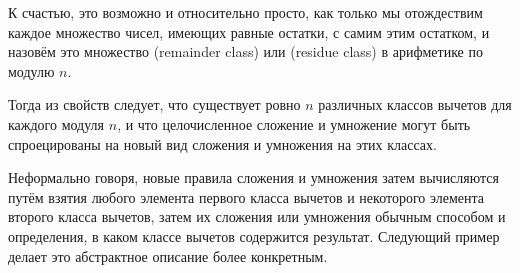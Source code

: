К счастью, это возможно и относительно просто, как только мы отождествим каждое множество чисел, имеющих равные остатки, с самим этим остатком, и назовём это множество  (remainder class) или  (residue class) в арифметике по модулю $n$.

Тогда из свойств  следует, что существует ровно $ n $ различных классов вычетов для каждого модуля $n$, и что целочисленное сложение и умножение могут быть спроецированы на новый вид сложения и умножения на этих классах.

Неформально говоря, новые правила сложения и умножения затем вычисляются путём взятия любого элемента первого класса вычетов и некоторого элемента второго класса вычетов, затем их сложения или умножения обычным способом и определения, в каком классе вычетов содержится результат. Следующий пример делает это абстрактное описание более конкретным.

